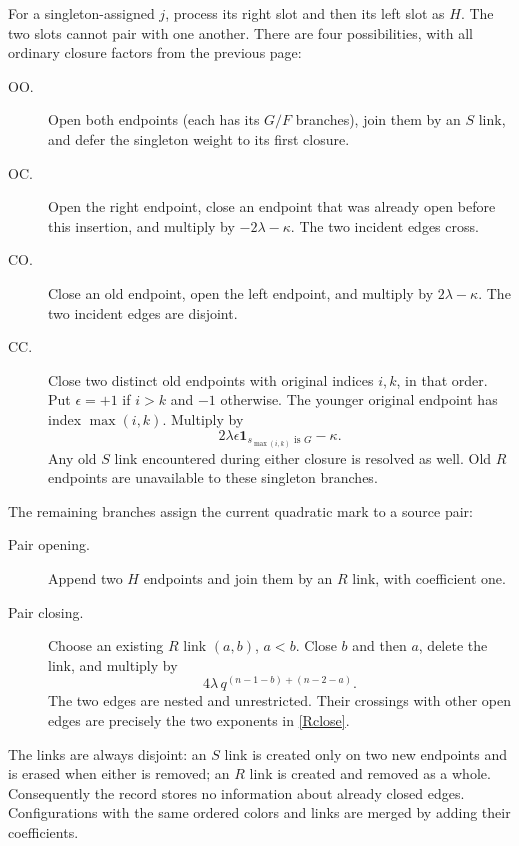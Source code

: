 \documentclass[11pt]{article}
\newcommand{\one}{\mathbf 1}
\begin{document}
For a singleton-assigned $j$, process its right slot and then its left
slot as $H$. The two slots cannot pair with one another. There are four
possibilities, with all ordinary closure factors from the previous page:
\begin{description}
\item[OO.] Open both endpoints (each has its $G/F$ branches), join
them by an $S$ link, and defer the singleton weight to its first closure.
\item[OC.] Open the right endpoint, close an endpoint that was already
open before this insertion, and multiply by $-2\lambda-\kappa$.
The two incident edges cross.
\item[CO.] Close an old endpoint, open the left endpoint, and multiply
by $2\lambda-\kappa$. The two incident edges are disjoint.
\item[CC.] Close two distinct old endpoints with original indices
$i,k$, in that order. Put $\epsilon=+1$ if $i>k$ and $-1$ otherwise.
The younger original endpoint has index $\max(i,k)$. Multiply by
\begin{equation}\label{CC}
 2\lambda\epsilon\one_{s_{\max(i,k)}\text{ is }G}-\kappa .
\end{equation}
Any old $S$ link encountered during either closure is resolved as well.
Old $R$ endpoints are unavailable to these singleton branches.
\end{description}
The remaining branches assign the current quadratic mark to a source
pair:
\begin{description}
\item[Pair opening.] Append two $H$ endpoints and join them by an $R$
link, with coefficient one.
\item[Pair closing.] Choose an existing $R$ link $(a,b)$, $a<b$.
Close $b$ and then $a$, delete the link, and multiply by
\begin{equation}\label{Rclose}
 4\lambda\,q^{(n-1-b)+(n-2-a)}.
\end{equation}
The two edges are nested and unrestricted. Their crossings with
other open edges are precisely the two exponents in \eqref{Rclose}.
\end{description}
The links are always disjoint: an $S$ link is created only on two new
endpoints and is erased when either is removed; an $R$ link is created
and removed as a whole. Consequently the record stores no information
about already closed edges. Configurations with the same ordered colors
and links are merged by adding their coefficients.
\end{document}

